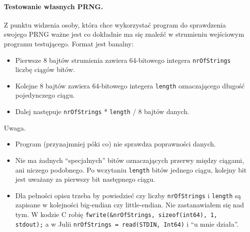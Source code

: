 \documentclass[a4paper, 10pt]{article}
\begin{document}
\paragraph{Testowanie własnych PRNG.}
Z punktu widzenia osoby, która chce wykorzystać program do sprawdzenia swojego PRNG ważne jest co dokładnie ma się znaleźć w strumieniu wejściowym programu testującego. Format jest banalny:
\begin{itemize}
 \item Pierwsze 8 bajtów strumienia zawiera 64-bitowego integera \texttt{nrOfStrings} liczbę ciągów bitów.
 \item Kolejne 8 bajtów zawiera 64-bitowego integera \texttt{length} oznaczającego długość pojedynczego ciągu.
 \item Dalej następuje \texttt{nrOfStrings} * \texttt{length} / 8 bajtów danych.
\end{itemize}
Uwaga.
\begin{itemize}
 \item Program (przynajmniej póki co) nie sprawdza poprawności danych.
 \item Nie ma żadnych ``specjalnych'' bitów oznaczających przerwy między ciągami, ani niczego podobnego. Po wczytaniu \texttt{length} bitów jednego ciągu, kolejny bit jest uważany za pierwszy bit następnego ciągu.
 \item {Dla pełności opisu trzeba by powiedzieć czy liczby \texttt{nrOfStrings} i \texttt{length} są zapisane w kolejności big-endian czy little-endian.
        Nie zastanawiałem się nad tym. W kodzie C robię
    \texttt{fwrite(\&nrOfStrings, sizeof(int64), 1, stdout);}
a w Julii
    \texttt{nrOfStrings = read(STDIN, Int64)}
i ``u mnie działa''. 
 }
\end{itemize}
\end{document}
